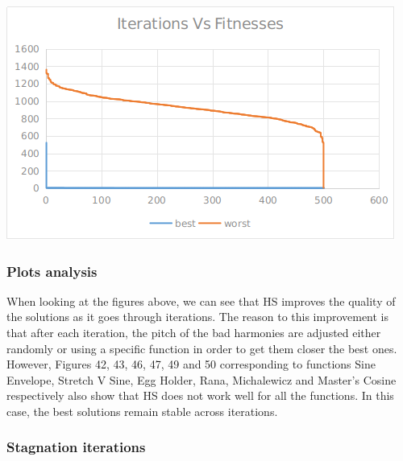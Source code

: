 \documentclass[12pt]{article}
\begin{document}
					\hfill
					\begin{minipage}{0.6\linewidth}
						\includegraphics[width=\linewidth]{54.png}
					\end{minipage}
				\subsubsection{Plots analysis}
				
					When looking at the figures above, we can see that HS improves the quality of the solutions as it goes through iterations. The reason to this improvement is that after each iteration, the pitch of the bad harmonies are adjusted either randomly or using a specific function in order to get them closer the best ones. However, Figures 42, 43, 46, 47, 49 and 50 corresponding to functions Sine Envelope, Stretch V Sine, Egg Holder, Rana, Michalewicz and Master's Cosine respectively also show that HS does not work well for all the functions. In this case, the best solutions remain stable across iterations.
				\newpage
				\subsubsection{Stagnation iterations}
				
\end{document}
